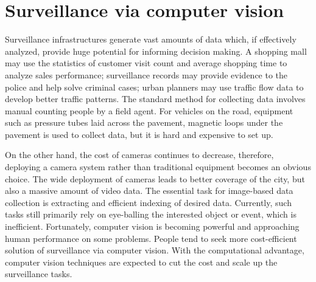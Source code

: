 \section{Surveillance via computer vision}
\label{sec:intro-surveillance}

Surveillance infrastructures generate vast amounts of data which, if effectively analyzed, provide huge potential for informing decision making.
A shopping mall may use the statistics of customer visit count and average shopping time to analyze sales performance; 
surveillance records may provide evidence to the police and help solve criminal cases;
urban planners may use traffic flow data to develop better traffic patterns.
The standard method for collecting data involves manual counting people by a field agent.
For vehicles on the road, equipment such as pressure tubes laid across the pavement, magnetic loops under the pavement \cite{klein2006traffic,mimbela2000summary} is used to collect data, but it is hard and expensive to set up.

On the other hand, the cost of cameras continues to decrease, therefore, deploying a camera system rather than traditional equipment becomes an obvious choice.
The wide deployment of cameras leads to better coverage of the city, but also a massive amount of video data.
The essential task for image-based data collection is extracting and efficient indexing of desired data.
Currently, such tasks still primarily rely on eye-balling the interested object or event, which is inefficient.
Fortunately, computer vision is becoming powerful and approaching human performance on some problems.
People tend to seek more cost-efficient solution of surveillance via computer vision.
With the computational advantage, computer vision techniques are expected to cut the cost and scale up the surveillance tasks.